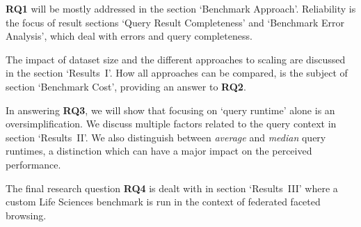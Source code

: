 \textbf{RQ1} will be mostly addressed in the section `Benchmark Approach'. Reliability is the focus of result sections `Query Result Completeness' and `Benchmark Error Analysis', 
which deal with errors and query completeness. 

The impact of dataset size and the different approaches to scaling are discussed in the section `Results~I'.
How all approaches can be compared, is the subject of section `Benchmark Cost', %
providing an answer to \textbf{RQ2}. 

In answering \textbf{RQ3}, we will show that focusing on `query runtime' alone is an oversimplification. We discuss multiple factors related to the query context in section `Results~II'. %
We also distinguish between \emph{average} and \emph{median} query runtimes, 
a distinction which can have a major impact on the perceived performance.

The final research question \textbf{RQ4} is dealt with in section `Results~III'
where a custom Life Sciences benchmark is run in the context of federated faceted browsing. 
